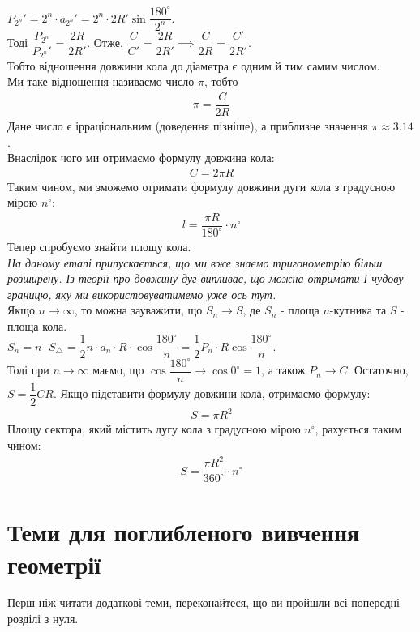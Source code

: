 \documentclass[a4paper, 10pt]{article}
\theoremstyle{theoremdd}
\theoremstyle{theoremdd}
\theoremstyle{theoremdd}
\theoremstyle{theoremdd}
\theoremstyle{theoremdd}
\theoremstyle{theoremdd}
\theoremstyle{theoremdd}
\theoremstyle{theoremdd}
\theoremstyle{theoremdd}
\begin{document}
$P_{2^n}' = 2^n \cdot a_{2^n}' = 2^n \cdot 2R' \sin \dfrac{180^\circ}{2^n}$.\\
Тоді $\dfrac{P_{2^n}}{P_{2^n}'} = \dfrac{2R}{2R'}$. Отже, $\dfrac{C}{C'} = \dfrac{2R}{2R'} \implies \dfrac{C}{2R} = \dfrac{C'}{2R'}$.\\
Тобто відношення довжини кола до діаметра є одним й тим самим числом.\\
Ми таке відношення називаємо число $\pi$, тобто
\begin{align*}
\pi = \dfrac{C}{2R}
\end{align*}
Дане число є ірраціональним (доведення пізніше), а приблизне значення $\pi \approx 3.14$.\\
Внаслідок чого ми отримаємо формулу довжина кола:
\begin{align*}
C = 2\pi R
\end{align*}
Таким чином, ми зможемо отримати формулу довжини дуги кола з градусною мірою $n^\circ$:
\begin{align*}
l = \dfrac{\pi R}{180^\circ} \cdot n^\circ
\end{align*}
Тепер спробуємо знайти площу кола.\\
\textit{На даному етапі припускається, що ми вже знаємо тригонометрію більш розширену. Із теорії про довжину дуг випливає, що можна отримати І чудову границю, яку ми використовуватимемо уже ось тут.}\\
Якщо $n \to \infty$, то можна зауважити, що $S_n \to S$, де $S_n$ - площа $n$-кутника та $S$ - площа кола.
\bigskip \\
$S_n = n \cdot S_{\triangle} = \dfrac{1}{2} n \cdot a_n \cdot R \cdot \cos \dfrac{180^\circ}{n} = \dfrac{1}{2} P_n \cdot R \cos \dfrac{180^\circ}{n}$.\\
Тоді при $n \to \infty$ маємо, що $\cos \dfrac{180^\circ}{n} \to \cos 0^\circ = 1$, а також $P_n \to C$. Остаточно,\\
$S = \dfrac{1}{2} CR$. Якщо підставити формулу довжини кола, отримаємо формулу:
\begin{align*}
S = \pi R^2
\end{align*}
Площу сектора, який містить дугу кола з градусною мірою $n^\circ$, рахується таким чином:
\begin{align*}
S = \dfrac{\pi R^2}{360^\circ} \cdot n^\circ
\end{align*}
\newpage

\fi

\section{Теми для поглибленого вивчення геометрії}
Перш ніж читати додаткові теми, переконайтеся, що ви пройшли всі попередні розділі з нуля.
\end{document}
